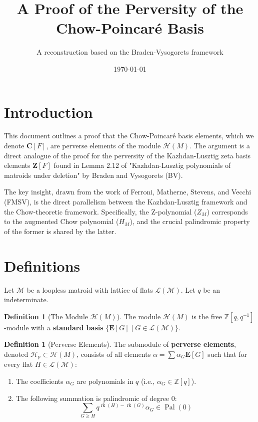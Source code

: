 \documentclass{article}
\title{A Proof of the Perversity of the Chow-Poincaré Basis}
\author{A reconstruction based on the Braden-Vysogorets framework}
\date{\today}
\theoremstyle{definition}
\newtheorem{definition}[theorem]{Definition}
\newcommand{\matroid}[1]{\mathcal{#1}}
\newcommand{\Hmod}[1]{\mathcal{H}(#1)}
\newcommand{\Hp}{\mathcal{H}_p}
\newcommand{\Lattice}{\mathcal{L}}
\newcommand{\rank}{\operatorname{rk}}
\newcommand{\Pal}{\operatorname{Pal}}
\newcommand{\Zbasis}[1]{\mathbf{Z}[#1]}
\newcommand{\Cbasis}[1]{\mathbf{C}[#1]}
\newcommand{\Ebasis}[1]{\mathbf{E}[#1]}
\newcommand{\Zpoly}[1]{Z_{#1}}
\newcommand{\AugChowpoly}[1]{H_{#1}}
\begin{document}
\maketitle

\section{Introduction}

This document outlines a proof that the Chow-Poincaré basis elements, which we denote $\Cbasis{F}$, are perverse elements of the module $\Hmod{M}$. The argument is a direct analogue of the proof for the perversity of the Kazhdan-Lusztig zeta basis elements $\Zbasis{F}$ found in Lemma 2.12 of "Kazhdan-Lusztig polynomials of matroids under deletion" by Braden and Vysogorets (BV).

The key insight, drawn from the work of Ferroni, Matherne, Stevens, and Vecchi (FMSV), is the direct parallelism between the Kazhdan-Lusztig framework and the Chow-theoretic framework. Specifically, the Z-polynomial ($\Zpoly{M}$) corresponds to the augmented Chow polynomial ($\AugChowpoly{M}$), and the crucial palindromic property of the former is shared by the latter.

\section{Definitions}

Let $\matroid{M}$ be a loopless matroid with lattice of flats $\Lattice(\matroid{M})$. Let $q$ be an indeterminate.

\begin{definition}[The Module $\Hmod{M}$]
The module $\Hmod{M}$ is the free $\mathbb{Z}[q, q^{-1}]$-module with a \textbf{standard basis} $\{\Ebasis{G} \mid G \in \Lattice(\matroid{M})\}$.
\end{definition}

\begin{definition}[Perverse Elements]
The submodule of \textbf{perverse elements}, denoted $\Hp \subset \Hmod{M}$, consists of all elements $\alpha = \sum \alpha_G \Ebasis{G}$ such that for every flat $H \in \Lattice(\matroid{M})$:
\begin{enumerate}
    \item The coefficients $\alpha_G$ are polynomials in $q$ (i.e., $\alpha_G \in \mathbb{Z}[q]$).
    \item The following summation is palindromic of degree 0:
    \[ \sum_{G \ge H} q^{\rank(H) - \rank(G)} \alpha_G \in \Pal(0) \]
\end{enumerate}
\end{definition}
\end{document}
